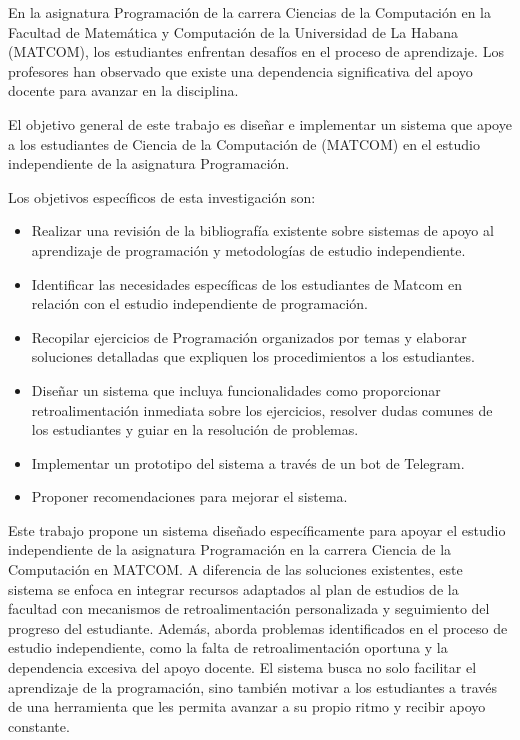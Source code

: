 En la asignatura Programación de la carrera Ciencias de la Computación en la Facultad de Matemática y Computación de la Universidad de La Habana (\mbox{MATCOM}), los estudiantes enfrentan desafíos en el proceso de aprendizaje. Los profesores han observado que existe una dependencia significativa del apoyo docente para avanzar en la disciplina.

El objetivo general de este trabajo es diseñar e implementar un sistema que apoye a los estudiantes de Ciencia de la Computación de (\mbox{MATCOM}) en el estudio independiente de la asignatura Programación.

Los objetivos específicos de esta investigación son:
\begin{itemize}
    \item Realizar una revisión de la bibliografía existente sobre sistemas de apoyo al aprendizaje de programación y metodologías de estudio independiente.
    \item Identificar las necesidades específicas de los estudiantes de Matcom en relación con el estudio independiente de programación.
    \item Recopilar ejercicios de Programación organizados por temas y elaborar soluciones detalladas que expliquen los procedimientos a los estudiantes.
    \item Diseñar un sistema que incluya funcionalidades como proporcionar retroalimentación inmediata sobre los ejercicios, resolver dudas comunes de los estudiantes y guiar en la resolución de problemas.
    \item Implementar un prototipo del sistema a través de un bot de Telegram.
    \item Proponer recomendaciones para mejorar el sistema.
\end{itemize}

Este trabajo propone un sistema diseñado específicamente para apoyar el estudio independiente de la asignatura Programación en la carrera Ciencia de la Computación en \mbox{MATCOM}. A diferencia de las soluciones existentes, este sistema se enfoca en integrar recursos adaptados al plan de estudios de la facultad con mecanismos de retroalimentación personalizada y seguimiento del progreso del estudiante. Además, aborda problemas identificados en el proceso de estudio independiente, como la falta de retroalimentación oportuna y la dependencia excesiva del apoyo docente. El sistema busca no solo facilitar el aprendizaje de la programación, sino también motivar a los estudiantes a través de una herramienta que les permita avanzar a su propio ritmo y recibir apoyo constante.

